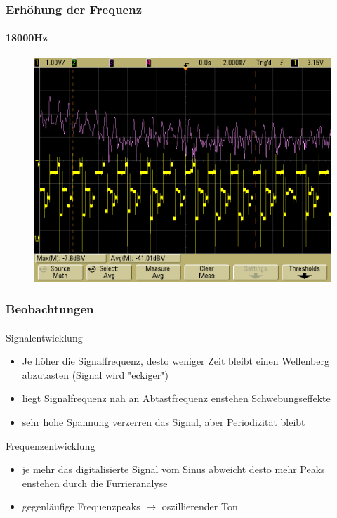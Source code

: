 \begin{frame}
    \frametitle{Erhöhung der Frequenz}
    \framesubtitle{18000Hz}
            \begin{figure}[H]
            \begin{center}
                    \includegraphics[scale=0.2]{./img/oszi/scope_29.png}
            \end{center}
            \end{figure}
\end{frame}
\begin{frame}
    \frametitle{Beobachtungen}
    \framesubtitle{}
    \begin{block}{Signalentwicklung}
        \begin{itemize}
            \item Je höher die Signalfrequenz, desto weniger Zeit bleibt einen
            Wellenberg abzutasten (Signal wird "eckiger")
            \item liegt Signalfrequenz nah an Abtastfrequenz enstehen
            Schwebungseffekte
            \item sehr hohe Spannung verzerren das Signal, aber Periodizität
            bleibt
        \end{itemize}
    \end{block}
    \begin{block}{Frequenzentwicklung}
        \begin{itemize}
            \item je mehr das digitalisierte Signal vom Sinus abweicht desto
            mehr Peaks enstehen durch die Furrieranalyse
            \item gegenläufige Frequenzpeaks $\rightarrow$ oszillierender Ton
        \end{itemize}
    \end{block}
\end{frame}
